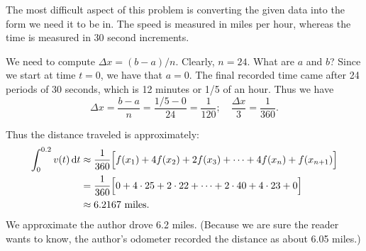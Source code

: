 \begin{example}
The most difficult aspect of this problem is converting the given data into the form we need it to be in. The speed is measured in miles per hour, whereas the time is measured in 30 second increments.

We need to compute $\Delta x = (b-a)/n$. Clearly, $n=24$. What are $a$ and $b$? Since we start at time $t=0$, we have that $a=0$. The final recorded time came after 24 periods of 30 seconds, which is 12 minutes or 1/5 of an hour. Thus we have
\[\Delta x = \frac{b-a}{n} = \frac{1/5-0}{24} = \frac1{120}; \quad \frac{\Delta x}{3} = \frac{1}{360}.\]

Thus the distance traveled is approximately:
\begin{align*}
\int_0^{0.2}v(t)\operatorname{d}\! t &\approx \frac{1}{360}\Bigl[f(x_1)+4f(x_2) + 2f(x_3) + \dots + 4f(x_n)+f(x_{n+1})\Bigr]\\
					&= \frac{1}{360}\Bigl[0+4\cdot25+2\cdot 22 + \dots + 2\cdot40+4\cdot 23 + 0\Bigr]\\
					&\approx 6.2167 \ \text{miles.}
\end{align*}
We approximate the author drove 6.2 miles. (Because we are sure the reader wants to know, the author's odometer recorded the distance as about 6.05 miles.)
\end{example}

%
%

